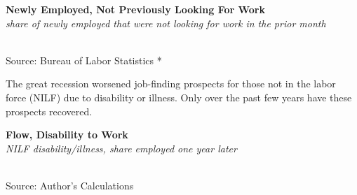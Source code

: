 \documentclass{report}
\makeatletter
\newcommand{\tbllink}[1]{\href{https://raw.githubusercontent.com/bdecon/US-chartbook/master/chartbook/data/#1}{\faTable}}
\newcommand*\short[1]{\expandafter\@gobbletwo\number\numexpr#1\relax}
\newcommand{\dateaxisticks}{
		date coordinates in=x, axis line style={draw=none},
		xmax={2020-02-01},
		max space between ticks=40,	    
		xtick={{1990-01-01}, {1992-01-01}, {1994-01-01}, 
			{1996-01-01}, {1998-01-01}, {2000-01-01}, 
			{2002-01-01}, {2004-01-01}, {2006-01-01},
			{2008-01-01}, {2010-01-01}, {2012-01-01}, {2014-01-01},
		    {2016-01-01}, {2018-01-01}, {2020-01-01}},
		minor xtick={{1989-01-01}, {1991-01-01}, {1993-01-01},
			{1995-01-01}, {1997-01-01}, {1999-01-01}, 
			{2001-01-01}, {2003-01-01}, {2005-01-01}, {2007-01-01},
		    {2009-01-01}, {2011-01-01}, {2013-01-01}, {2015-01-01},
		    {2017-01-01}, {2019-01-01}},
		enlarge y limits={0.06}, enlarge x limits={0.01},
		}
\newcommand{\bbar}[2]{extra #1 ticks = {{#2}}, extra #1 tick labels = ,
		extra #1 tick style = {grid=major, grid style={thick, black!25}},}
\newcommand{\stdline}[4]{\addplot[very thick, no markers, color=#1] 
		table [x=#2, y=#3, col sep=comma] {#4};	}
\newcommand{\rbars}{
		\fill[color=black!10] (axis cs:{1990-07-01},\pgfkeysvalueof{/pgfplots/ymin}) rectangle 
			(axis cs:{1991-03-01}, \pgfkeysvalueof{/pgfplots/ymax});
		\fill[color=black!10] (axis cs:{2007-12-01},\pgfkeysvalueof{/pgfplots/ymin}) rectangle 
			(axis cs:{2009-07-01}, \pgfkeysvalueof{/pgfplots/ymax});
		\fill[color=black!10] (axis cs:{2001-03-01},\pgfkeysvalueof{/pgfplots/ymin}) rectangle 
			(axis cs:{2001-11-01}, \pgfkeysvalueof{/pgfplots/ymax});}
\makeatother
\begin{document}
{{{{\begin{minipage}{0.76\textwidth}
\vspace{2mm}

\noindent \normalsize \textbf{Newly Employed, Not Previously Looking For Work}\\
\footnotesize{\textit{share of newly employed that were not looking for work in the prior month}}\\
\noindent \hspace*{-2mm} \\
\footnotesize{Source: Bureau of Labor Statistics} \hfill \tbllink{lf_flow.csv}*

\end{minipage}

\vspace{5mm}

\begin{minipage}{0.30\textwidth}
\small The great recession worsened job-finding prospects for those not in the labor force (NILF) due to disability or illness. Only over the past few years have these prospects recovered. 
\end{minipage} \hspace{8mm} \begin{minipage}{0.38\textwidth}
\noindent \normalsize \textbf{Flow, Disability to Work}\\
\footnotesize{\textit{NILF disability/illness, share employed one year later}}\\
\noindent \hspace*{-2mm} \\
\footnotesize{Source: Author's Calculations} \hfill \tbllink{disflow.csv}
\end{minipage}

\vspace{8mm}

}}}}
\end{document}
